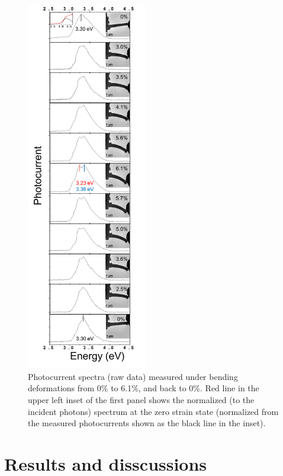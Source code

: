 \begin{figure}  
\includegraphics[width=150pt]{figures/figure5_2}
\centering
\caption[Splitting of photocurrent spectroscopy.]{Photocurrent spectra (raw data) measured under bending deformations from 0\% to 6.1\%, and back to 0\%. Red line in the upper left inset of the first panel shows the normalized (to the incident photons) spectrum at the zero strain state (normalized from the measured photocurrents shown as the black line in the inset).
\label{fig:5_2}}
\end{figure}

\section{Results and disscussions}


